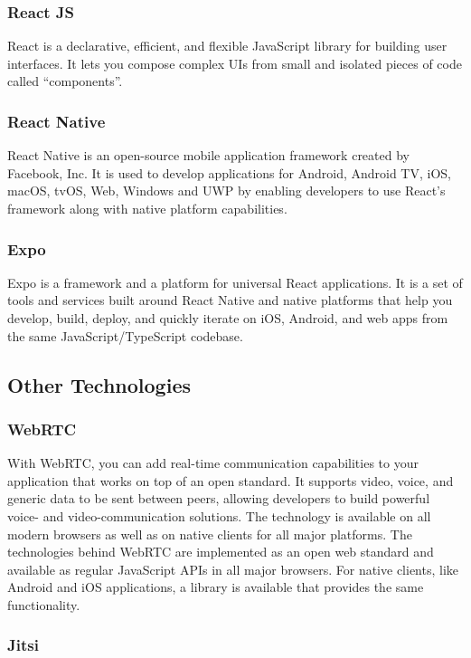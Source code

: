     \subsubsection{React JS}
    React is a declarative, efficient, and flexible JavaScript library for building user interfaces. 
    It lets you compose complex UIs from small and isolated pieces of code called “components”.

    \subsubsection{React Native}
    React Native is an open-source mobile application framework created by Facebook, Inc.
    It is used to develop applications for Android, Android TV, iOS, macOS, tvOS, Web, Windows and UWP by enabling 
    developers to use React's framework along with native platform capabilities.

    \subsubsection{Expo}
    Expo is a framework and a platform for universal React applications. 
    It is a set of tools and services built around React Native and native platforms that help you develop, build, 
    deploy, and quickly iterate on iOS, Android, and web apps from the same JavaScript/TypeScript codebase.

\subsection{Other Technologies}

    \subsubsection{WebRTC}
    With WebRTC, you can add real-time communication capabilities to your application that works on top of an open standard. 
    It supports video, voice, and generic data to be sent between peers, allowing developers to build powerful 
    voice- and video-communication solutions. The technology is available on all modern browsers as well as on native clients 
    for all major platforms. The technologies behind WebRTC are implemented as an open web standard and available as regular JavaScript APIs 
    in all major browsers. For native clients, like Android and iOS applications, a library is available that provides the same functionality.

    \subsubsection{Jitsi}

